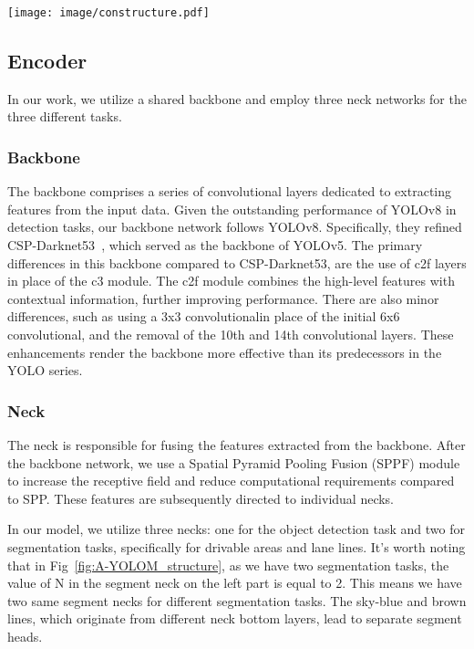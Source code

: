 \documentclass[lettersize,journal]{IEEEtran}
\begin{document}
\begin{figure*}[ht]
    \centering
    \texttt{[image: image/constructure.pdf]}
    \caption{A-YOLOM structure}
    \label{fig:A-YOLOM_structure}
\end{figure*}


\subsection{Encoder}
\label{subsec: Encoder}
In our work, we utilize a shared backbone and employ three neck networks for the three different tasks. 

\subsubsection{Backbone}
\label{subsubsec: Backbone}
The backbone comprises a series of convolutional layers dedicated to extracting features from the input data. Given the outstanding performance of YOLOv8 in detection tasks, our backbone network follows YOLOv8. Specifically, they refined CSP-Darknet53~\cite{wang2021scaled}, which served as the backbone of YOLOv5. The primary differences in this backbone compared to CSP-Darknet53, are the use of c2f layers in place of the c3 module. The c2f module combines the high-level features with contextual information, further improving performance. There are also minor differences, such as using a 3x3 convolutionalin place of the initial 6x6 convolutional, and the removal of the 10th and 14th convolutional layers. These enhancements render the backbone more effective than its predecessors in the YOLO series. 

\subsubsection{Neck}
\label{subsubsec: Neck}
The neck is responsible for fusing the features extracted from the backbone. After the backbone network, we use a Spatial Pyramid Pooling Fusion (SPPF) module to increase the receptive field and reduce computational requirements compared to SPP. These features are subsequently directed to individual necks.

In our model, we utilize three necks: one for the object detection task and two for segmentation tasks, specifically for drivable areas and lane lines. It's worth noting that in Fig~\ref{fig:A-YOLOM_structure}, as we have two segmentation tasks, the value of N in the segment neck on the left part is equal to 2. This means we have two same segment necks for different segmentation tasks. The sky-blue and brown lines, which originate from different neck bottom layers, lead to separate segment heads. 
\end{document}
